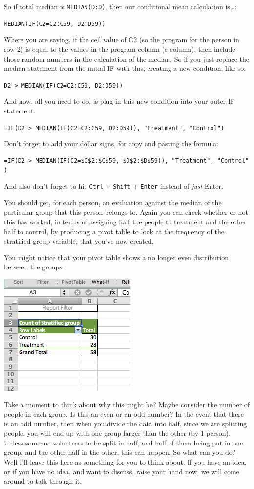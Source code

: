 \documentclass[]{book}
\theoremstyle{definition}
\theoremstyle{definition}
\theoremstyle{definition}
\theoremstyle{remark}
\begin{document}
So if total median is \texttt{MEDIAN(D:D)}, then our conditional mean
calculation is\ldots{}:

\texttt{MEDIAN(IF(C2=C2:C59,\ D2:D59))}

Where you are saying, if the cell value of C2 (so the program for the
person in row 2) is equal to the values in the program column (c
column), then include those random numbers in the calculation of the
median. So if you just replace the median statement from the initial IF
with this, creating a new condition, like so:

\texttt{D2\ \textgreater{}\ MEDIAN(IF(C2=C2:C59,\ D2:D59))}

And now, all you need to do, is plug in this new condition into your
outer IF statement:

\texttt{=IF(D2\ \textgreater{}\ MEDIAN(IF(C2=C2:C59,\ D2:D59)),\ "Treatment",\ "Control")}

Don't forget to add your dollar signs, for copy and pasting the formula:

\texttt{=IF(D2\ \textgreater{}\ MEDIAN(IF(C2=\$C\$2:\$C\$59,\ \$D\$2:\$D\$59)),\ "Treatment",\ "Control")}

And also don't forget to hit \texttt{Ctrl} + \texttt{Shift} +
\texttt{Enter} instead of \emph{just} Enter.

You should get, for each person, an evaluation against the median of the
particular group that this person belongs to. Again you can check
whether or not this has worked, in terms of assigning half the people to
treatment and the other half to control, by producing a pivot table to
look at the frequency of the stratified group variable, that you've now
created.

You might notice that your pivot table shows a no longer even
distribution between the groups:

\includegraphics{imgs/uneven_pivot.png}

Take a moment to think about why this might be? Maybe consider the
number of people in each group. Is this an even or an odd number? In the
event that there is an odd number, then when you divide the data into
half, since we are splitting people, you will end up with one group
larger than the other (by 1 person). Unless someone volunteers to be
split in half, and half of them being put in one group, and the other
half in the other, this can happen. So what can you do? Well I'll leave
this here as something for you to think about. If you have an idea, or
if you have no idea, and want to discuss, raise your hand now, we will
come around to talk through it.
\end{document}
